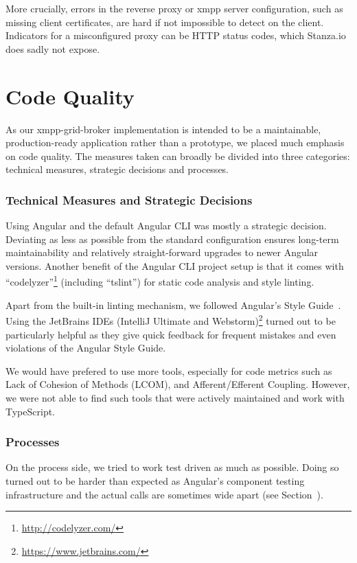 More crucially, errors in the reverse proxy or \gls{xmpp} server configuration, such as missing client certificates, are hard if not impossible to detect on the client. Indicators for a misconfigured proxy can be HTTP status codes, which Stanza.io does sadly not expose.

\section{Code Quality}
As our \gls{xmpp-grid-broker} implementation is intended to be a maintainable, production-ready application rather than a prototype, we placed much emphasis on code quality.
The measures taken can broadly be divided into three categories: technical measures, strategic decisions and processes.

\subsubsection{Technical Measures and Strategic Decisions}
Using Angular and the default Angular CLI was mostly a strategic decision.
Deviating as less as possible from the standard configuration ensures long-term maintainability and relatively straight-forward upgrades to newer Angular versions.
Another benefit of the Angular CLI project setup is that it comes with ``codelyzer''\footnote{\url{http://codelyzer.com/}} (including ``tslint'') for static code analysis and style linting.

Apart from the built-in linting mechanism, we followed Angular's Style Guide~\cite{angular-style-guide}.
Using the JetBrains IDEs (IntelliJ Ultimate and Webstorm)\footnote{\url{https://www.jetbrains.com/}} turned out to be particularly helpful as they give quick feedback for frequent mistakes and even violations of the Angular Style Guide.

We would have prefered to use more tools, especially for code metrics such as Lack of Cohesion of Methods (LCOM), and Afferent/Efferent Coupling.
However, we were not able to find such tools that were actively maintained and work with TypeScript.

\subsubsection{Processes}

On the process side, we tried to work test driven as much as possible.
Doing so turned out to be harder than expected as Angular's component testing infrastructure and the actual calls are sometimes wide apart (see Section~).

